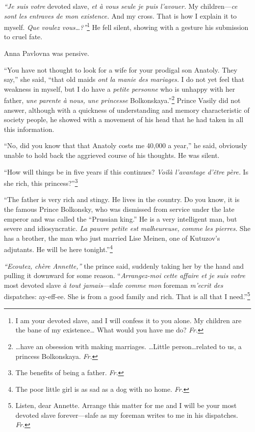 \textit{``Je suis votre} devoted slave, \textit{et \`a vous seule je puis l'avouer.} My children---\textit{ce sont les entraves de mon existence.} And my cross. That is how I explain it to myself. \textit{Que voulez vous\ldots{}?''}\footnote{I am your devoted slave, and I will confess it to you alone. My children are the bane of my existence\ldots{} What would you have me do? \textit{Fr.}} He fell silent, showing with a gesture his submission to cruel fate.

Anna Pavlovna was pensive.

``You have not thought to look for a wife for your prodigal son Anatoly. They say,'' she said, ``that old maids \textit{ont la manie des mariages.} I do not yet feel that weakness in myself, but I do have a \textit{petite personne} who is unhappy with her father, \textit{une parente \`a nous, une princesse} Bolkonskaya.''\footnote{\ldots{}have an obsession with making marriages. \ldots{}Little person\ldots{}related to us, a princess Bolkonskaya. \textit{Fr.}} Prince Vasily did not answer, although with a quickness of understanding and memory characteristic of society people, he showed with a movement of his head that he had taken in all this information. %

``No, did you know that that Anatoly costs me 40,000 a year,'' he said, obviously unable to hold back the aggrieved course of his thoughts. He was silent. %

``How will things be in five years if this continues? \textit{Voil\`a l'avantage d'\^etre p\`ere.} Is she rich, this princess?''\footnote{The benefits of being a father. \textit{Fr.}}

``The father is very rich and stingy. He lives in the country. Do you know, it is the famous Prince Bolkonsky, who was dismissed from service under the late emperor and was called the ``Prussian king.'' He is a very intelligent man, but severe and idiosyncratic. \textit{La pauvre petite est malheureuse, comme les pierres.} She has a brother, the man who just married Lise Meinen, one of Kutuzov's adjutants. He will be here tonight.''\footnote{The poor little girl is as sad as a dog with no home. \textit{Fr.}} %

\textit{``Ecoutez, ch\`ere Annette,''} the prince said, suddenly taking her by the hand and pulling it downward for some reason. ``\textit{Arrangez-moi cette affaire et je suis votre} most devoted slave \textit{\`a tout jamais}---slafe \textit{comme mon} foreman \textit{m'ecrit des} dispatches: ay-eff-ee. She is from a good family and rich. That is all that I need.''\footnote{Listen, dear Annette. Arrange this matter for me and I will be your most devoted slave forever---slafe as my foreman writes to me in his dispatches. \textit{Fr.}} %

